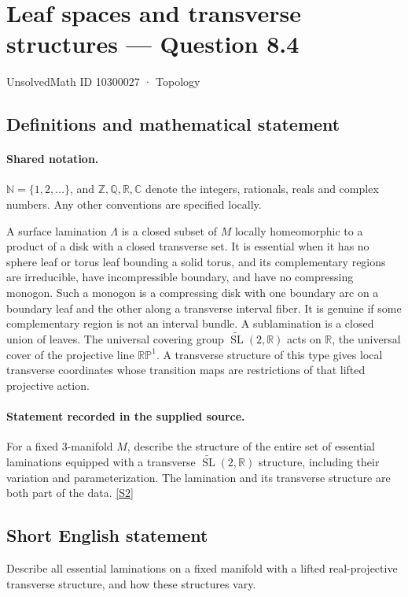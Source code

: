 \documentclass[11pt]{article}
\newcommand{\sref}[2]{\hyperlink{source:#1:#2}{[S#2]}}
\begin{document}
\setcounter{section}{10300026}
\section{Leaf spaces and transverse structures — Question 8.4}\label{10300027}
{\small\sffamily UnsolvedMath ID 10300027 · Topology}
\subsection{Definitions and mathematical statement}

\paragraph{Shared notation.}$\mathbb N=\{1,2,\ldots\}$, and $\mathbb Z,\mathbb Q,\mathbb R,\mathbb C$ denote the integers, rationals, reals and complex numbers. Any other conventions are specified locally.


A surface lamination $\Lambda$ is a closed subset of $M$ locally homeomorphic to a product of a disk with a closed transverse set. It is essential when it has no sphere leaf or torus leaf bounding a solid torus, and its complementary regions are irreducible, have incompressible boundary, and have no compressing monogon. Such a monogon is a compressing disk with one boundary arc on a boundary leaf and the other along a transverse interval fiber. It is genuine if some complementary region is not an interval bundle. A sublamination is a closed union of leaves. The universal covering group $\widetilde{\operatorname{SL}}(2,\mathbb R)$ acts on $\mathbb R$, the universal cover of the projective line $\mathbb{RP}^1$. A transverse structure of this type gives local transverse coordinates whose transition maps are restrictions of that lifted projective action.
\paragraph{Statement recorded in the supplied source.}
For a fixed $3$-manifold $M$, describe the structure of the entire set of essential laminations equipped with a transverse $\widetilde{\operatorname{SL}}(2,\mathbb R)$ structure, including their variation and parameterization. The lamination and its transverse structure are both part of the data. \sref{10300027}{2}
\subsection{Short English statement}
Describe all essential laminations on a fixed manifold with a lifted real-projective transverse structure, and how these structures vary.
\end{document}

